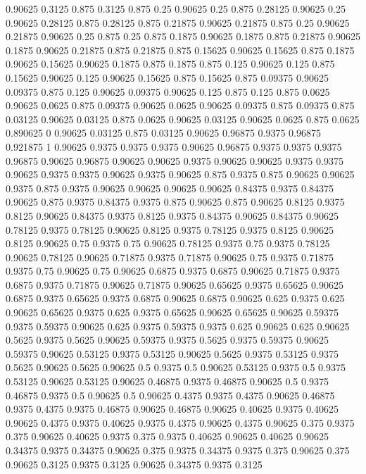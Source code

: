 0.90625 0.3125
0.875 0.3125
0.875 0.25
0.90625 0.25
0.875 0.28125
0.90625 0.25
0.90625 0.28125
0.875 0.28125
0.875 0.21875
0.90625 0.21875
0.875 0.25
0.90625 0.21875
0.90625 0.25
0.875 0.25
0.875 0.1875
0.90625 0.1875
0.875 0.21875
0.90625 0.1875
0.90625 0.21875
0.875 0.21875
0.875 0.15625
0.90625 0.15625
0.875 0.1875
0.90625 0.15625
0.90625 0.1875
0.875 0.1875
0.875 0.125
0.90625 0.125
0.875 0.15625
0.90625 0.125
0.90625 0.15625
0.875 0.15625
0.875 0.09375
0.90625 0.09375
0.875 0.125
0.90625 0.09375
0.90625 0.125
0.875 0.125
0.875 0.0625
0.90625 0.0625
0.875 0.09375
0.90625 0.0625
0.90625 0.09375
0.875 0.09375
0.875 0.03125
0.90625 0.03125
0.875 0.0625
0.90625 0.03125
0.90625 0.0625
0.875 0.0625
0.890625 0
0.90625 0.03125
0.875 0.03125
0.90625 0.96875
0.9375 0.96875
0.921875 1
0.90625 0.9375
0.9375 0.9375
0.90625 0.96875
0.9375 0.9375
0.9375 0.96875
0.90625 0.96875
0.90625 0.90625
0.9375 0.90625
0.90625 0.9375
0.9375 0.90625
0.9375 0.9375
0.90625 0.9375
0.90625 0.875
0.9375 0.875
0.90625 0.90625
0.9375 0.875
0.9375 0.90625
0.90625 0.90625
0.90625 0.84375
0.9375 0.84375
0.90625 0.875
0.9375 0.84375
0.9375 0.875
0.90625 0.875
0.90625 0.8125
0.9375 0.8125
0.90625 0.84375
0.9375 0.8125
0.9375 0.84375
0.90625 0.84375
0.90625 0.78125
0.9375 0.78125
0.90625 0.8125
0.9375 0.78125
0.9375 0.8125
0.90625 0.8125
0.90625 0.75
0.9375 0.75
0.90625 0.78125
0.9375 0.75
0.9375 0.78125
0.90625 0.78125
0.90625 0.71875
0.9375 0.71875
0.90625 0.75
0.9375 0.71875
0.9375 0.75
0.90625 0.75
0.90625 0.6875
0.9375 0.6875
0.90625 0.71875
0.9375 0.6875
0.9375 0.71875
0.90625 0.71875
0.90625 0.65625
0.9375 0.65625
0.90625 0.6875
0.9375 0.65625
0.9375 0.6875
0.90625 0.6875
0.90625 0.625
0.9375 0.625
0.90625 0.65625
0.9375 0.625
0.9375 0.65625
0.90625 0.65625
0.90625 0.59375
0.9375 0.59375
0.90625 0.625
0.9375 0.59375
0.9375 0.625
0.90625 0.625
0.90625 0.5625
0.9375 0.5625
0.90625 0.59375
0.9375 0.5625
0.9375 0.59375
0.90625 0.59375
0.90625 0.53125
0.9375 0.53125
0.90625 0.5625
0.9375 0.53125
0.9375 0.5625
0.90625 0.5625
0.90625 0.5
0.9375 0.5
0.90625 0.53125
0.9375 0.5
0.9375 0.53125
0.90625 0.53125
0.90625 0.46875
0.9375 0.46875
0.90625 0.5
0.9375 0.46875
0.9375 0.5
0.90625 0.5
0.90625 0.4375
0.9375 0.4375
0.90625 0.46875
0.9375 0.4375
0.9375 0.46875
0.90625 0.46875
0.90625 0.40625
0.9375 0.40625
0.90625 0.4375
0.9375 0.40625
0.9375 0.4375
0.90625 0.4375
0.90625 0.375
0.9375 0.375
0.90625 0.40625
0.9375 0.375
0.9375 0.40625
0.90625 0.40625
0.90625 0.34375
0.9375 0.34375
0.90625 0.375
0.9375 0.34375
0.9375 0.375
0.90625 0.375
0.90625 0.3125
0.9375 0.3125
0.90625 0.34375
0.9375 0.3125
